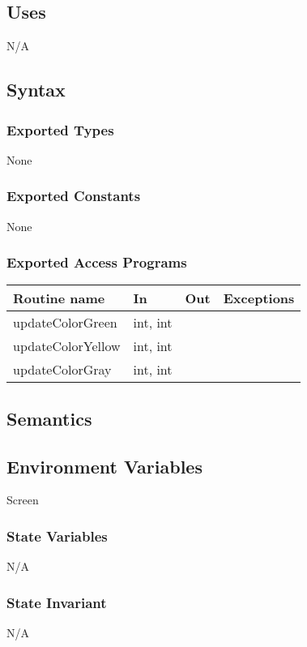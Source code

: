 \documentclass[12pt]{article}
\begin{document}
\subsection* {Uses}

N/A

\subsection* {Syntax}

\subsubsection* {Exported Types}

None

\subsubsection* {Exported Constants}

None

\subsubsection* {Exported Access Programs}

\begin{tabular}{| l | l | l | p{6cm} |}
\hline
\textbf{Routine name} & \textbf{In} & \textbf{Out} & \textbf{Exceptions}\\
\hline
updateColorGreen & int, int & ~ &  \\
\hline
updateColorYellow & int, int & ~ &  \\
\hline
updateColorGray & int, int & ~ &  \\
\hline
\end{tabular}

\subsection* {Semantics}

\subsection*{Environment Variables}

Screen

\subsubsection* {State Variables}
N/A
\subsubsection* {State Invariant}
N/A
\end{document}
